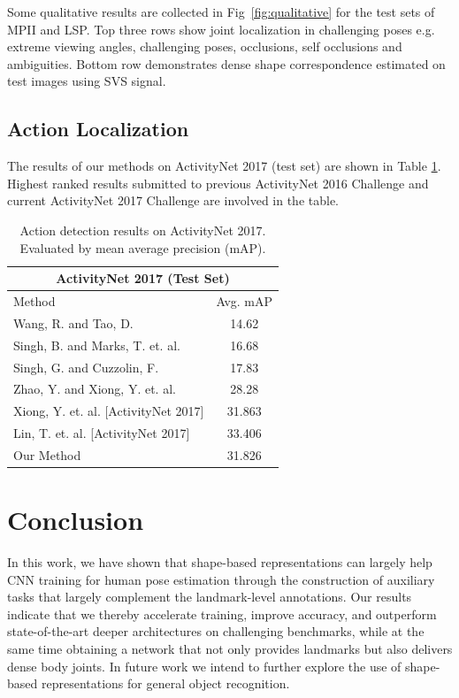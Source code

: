 Some qualitative results are collected in Fig~\ref{fig:qualitative} for the test sets of MPII and LSP. Top three rows show joint localization in challenging poses e.g. extreme viewing angles, challenging poses, occlusions, self occlusions and ambiguities. Bottom row demonstrates dense shape correspondence estimated on test images using SVS signal.

\subsection{Action Localization}

The results of our methods on ActivityNet 2017 (test set) are shown in Table \ref{table:experiment}. Highest ranked results submitted to previous ActivityNet 2016 Challenge and current ActivityNet 2017 Challenge are involved in the table.

\begin{table}[!htp]
  \centering
  \begin{tabular}{|l|c|}
  \hline
  \multicolumn{2}{|c|}{ActivityNet 2017 (Test Set)} \\
  \hline
  Method & Avg. mAP \\
  \hline
  Wang, R. and Tao, D. \cite{uts2016activitynet} & 14.62 \\
  Singh, B. and Marks, T. et. al. \cite{singh2016multi} & 16.68 \\
  Singh, G. and Cuzzolin, F. \cite{singh2016untrimmed} & 17.83 \\
  Zhao, Y. and Xiong, Y. et. al. \cite{zhao2017temporal} & 28.28 \\
  \hline
  Xiong, Y. et. al. [ActivityNet 2017] & 31.863 \\
  Lin, T. et. al. [ActivityNet 2017] & 33.406 \\
  \hline
  Our Method & 31.826 \\
  \hline
  \end{tabular}%
  \caption{Action detection results on ActivityNet 2017. Evaluated by mean average precision (mAP).}\label{table:experiment}
\end{table}

\label{sec:pred_mpii_lsp}

\section{Conclusion}
In this work, we have shown that shape-based representations can largely help CNN training for human pose estimation through the construction of auxiliary tasks that largely complement the landmark-level annotations. Our results indicate that we thereby accelerate training, improve accuracy, and outperform state-of-the-art deeper architectures on challenging benchmarks, while at the same time obtaining a network that not only provides landmarks but also delivers dense body joints. In future work we intend to further explore the use of shape-based representations for general object recognition. 

